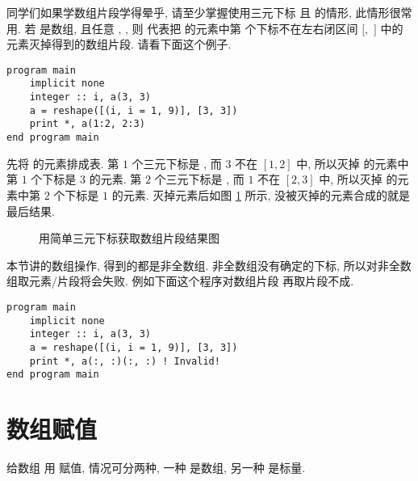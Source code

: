 同学们如果学数组片段学得晕乎, 请至少掌握使用三元下标  且  的情形, 此情形很常用. 若  是数组, 且任意 , , 则  代表把  的元素中第  个下标不在左右闭区间 $[$$,$ $]$ 中的元素灭掉得到的数组片段. 请看下面这个例子.
\begin{lstlisting}
program main
    implicit none
    integer :: i, a(3, 3)
    a = reshape([(i, i = 1, 9)], [3, 3])
    print *, a(1:2, 2:3)
end program main
\end{lstlisting}
先将  的元素排成表. 第 $1$ 个三元下标是 , 而 $3$ 不在 $[1,2]$ 中, 所以灭掉  的元素中第 $1$ 个下标是 $3$ 的元素. 第 $2$ 个三元下标是 , 而 $1$ 不在 $[2,3]$ 中, 所以灭掉  的元素中第 $2$ 个下标是 $1$ 的元素. 灭掉元素后如图 \ref{simple_a_step_1} 所示, 没被灭掉的元素合成的就是最后结果.
\begin{figure}[htbp]
    \centering
    \caption{用简单三元下标获取数组片段结果图}
    \label{simple_a_step_1}
\end{figure}

本节讲的数组操作, 得到的都是非全数组. 非全数组没有确定的下标, 所以对非全数组取元素/片段将会失败. 例如下面这个程序对数组片段  再取片段不成.
\begin{lstlisting}
program main
    implicit none
    integer :: i, a(3, 3)
    a = reshape([(i, i = 1, 9)], [3, 3])
    print *, a(:, :)(:, :) ! Invalid!
end program main
\end{lstlisting}

\section{数组赋值}\label{fortran_array_assignment}

给数组  用  赋值, 情况可分两种, 一种  是数组, 另一种  是标量.

